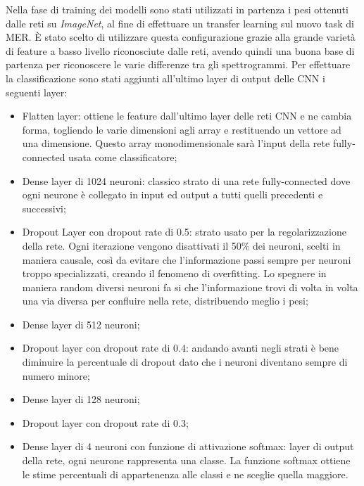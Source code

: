 \documentclass[11pt]{report}
\begin{document}
Nella fase di training dei modelli sono stati utilizzati in partenza i pesi ottenuti dalle reti su \textit{ImageNet}, al fine di effettuare un transfer learning sul nuovo task di MER. È stato scelto di utilizzare questa configurazione grazie alla grande varietà di feature a basso livello riconosciute dalle reti, avendo quindi una buona base di partenza per riconoscere le varie differenze tra gli spettrogrammi. Per effettuare la classificazione sono stati aggiunti all'ultimo layer di output delle CNN i seguenti layer:
\begin{itemize}
    \item Flatten layer: ottiene le feature dall'ultimo layer delle reti CNN e ne cambia forma, togliendo le varie dimensioni agli array e restituendo un vettore ad una dimensione. Questo array monodimensionale sarà l'input della rete fully-connected usata come classificatore;
    
    \item Dense layer di 1024 neuroni: classico strato di una rete fully-connected dove ogni neurone è collegato in input ed output a tutti quelli precedenti e successivi;
    
    \item Dropout Layer con dropout rate di 0.5: strato usato per la regolarizzazione della rete. Ogni iterazione vengono disattivati il 50\% dei neuroni, scelti in maniera causale, così da evitare che l'informazione passi sempre per neuroni troppo specializzati, creando il fenomeno di overfitting. Lo spegnere in maniera random diversi neuroni fa si che l'informazione trovi di volta in volta una via diversa per confluire nella rete, distribuendo meglio i pesi;

    \item Dense layer di 512 neuroni;
    
    \item Dropout layer con dropout rate di 0.4: andando avanti negli strati è bene diminuire la percentuale di dropout dato che i neuroni diventano sempre di numero minore;
    
    \item Dense layer di 128 neuroni;
    
    \item Dropout layer con dropout rate di 0.3;
    
    \item Dense layer di 4 neuroni con funzione di attivazione softmax: layer di output della rete, ogni neurone rappresenta una classe. La funzione softmax ottiene le stime percentuali di appartenenza alle classi e ne sceglie quella maggiore.
\end{itemize}
\end{document}
